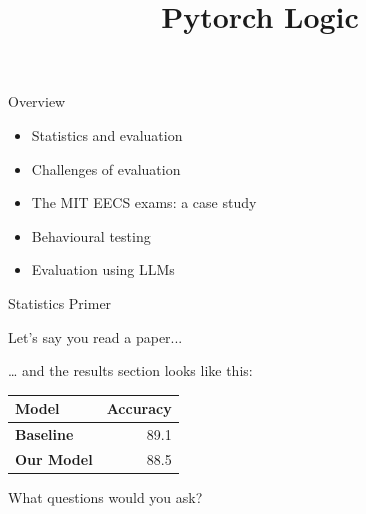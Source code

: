 




\newcommand{\titlefigure}{figure/python.png} %
\newcommand{\learninggoals}{
\item Understand how to evaluate LLMs 
\item Learn about pitfalls and challenges of evaluation
\item See some examples of behavioural testing of LLMs}

\renewcommand{\bfseries}{\mdseries}





\title{Pytorch Logic}
\date{}




\begin{vbframe}{Overview}

\vfill
 \begin{itemize}
 \item Statistics and evaluation
 \item Challenges of evaluation
 \item The MIT EECS exams: a case study
 \item Behavioural testing
 \item Evaluation using LLMs
 \end{itemize}


\vfill

\end{vbframe}

\begin{vbframe}{Statistics Primer}

\vfill

\end{vbframe}


\begin{vbframe}{Let's say you read a paper...}

	\vfill
	… and the results section looks like this:
	\begin{table}
		\centering
		\begin{tabular}{l|r}
			\textbf{Model} & \textbf{Accuracy} \\
			\hline
			\textbf{Baseline} & 89.1 \\
			\textbf{Our Model} & 88.5 \\
		\end{tabular}
	\end{table}
	What questions would you ask? 

\vfill

\end{vbframe}


